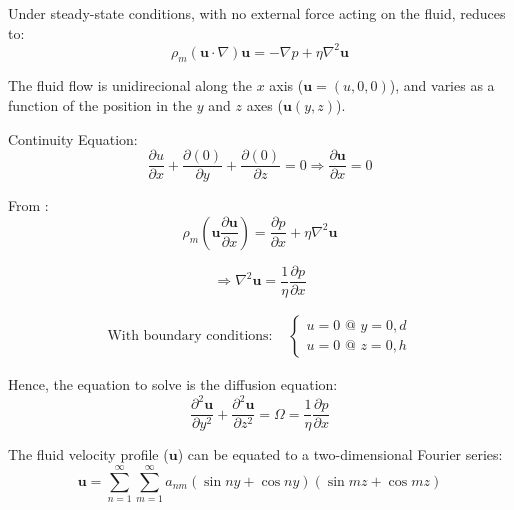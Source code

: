Under steady-state conditions, with no external force acting on the fluid,  reduces to:
\begin{equation}
 \rho_{m} (\mathbf{u} \cdot \nabla)\mathbf{u} = -\nabla p + \eta \nabla^{2}\mathbf{u}
\label{eqn:2}
\end{equation}

The fluid flow is unidirecional along the $x$ axis ($\textbf{u}=(u,0,0)$), and varies as a function of the position in the $y$ and $z$ axes ($\textbf{u}(y,z)$).

Continuity Equation:
\begin{equation}
 \frac{\partial u}{\partial x} + \frac{\partial \left (0  \right )}{\partial y} + \frac{\partial \left (0  \right )}{\partial z} = 0  \Rightarrow  \frac{\partial \textbf{u}}{\partial x} = 0
\label{eqn:3}
\end{equation}

From :
\begin{equation}
 \rho_{m} (\mathbf{u} \frac{\partial \mathbf{u}}{\partial x}) = \frac{\partial p}{\partial x} + \eta \nabla^{2}\mathbf{u}
\label{eqn:4}
\end{equation}


\begin{equation}
 \Rightarrow \nabla^{2}\mathbf{u} = \frac{1}{\eta}\frac{\partial p}{\partial x}
\label{eqn:5}
\end{equation}

\begin{eqnarray}
\textrm{With boundary conditions: }& 
\left\{\begin{matrix}
u=0 \textrm{ @ } y=0,d\\ 
u=0 \textrm{ @ } z=0,h
\end{matrix}\right.
\label{eqn:6}
\end{eqnarray}


Hence, the equation to solve is the diffusion equation:
\begin{equation}
 \frac{\partial^2 \mathbf{u}}{\partial y^2} + \frac{\partial^2 \mathbf{u}}{\partial z^2} = \Omega = \frac{1}{\eta}\frac{\partial p}{\partial x}
\label{eqn:6b}
\end{equation}

The fluid velocity profile ($\mathbf{u}$) can be equated to a two-dimensional Fourier series:
\begin{equation}
 \mathbf{u} = \sum_{n=1}^{\infty } \sum_{m=1}^{\infty } a_{nm} (\sin ny + \cos ny) (\sin mz + \cos mz)
\label{eqn:7}
\end{equation}

